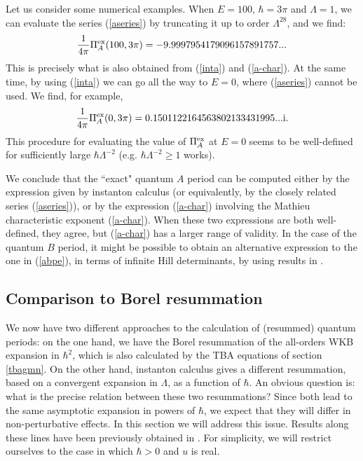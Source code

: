 \documentclass[a4paper,11pt]{article}
\theoremstyle{definition}
\newcommand{\ri}{{\rm i}}
\newcommand{\be}{\begin{equation}}
\newcommand{\ee}{\end{equation}}
\begin{document}
Let us consider some numerical examples. When $E=100$, $\hbar=3 \pi$ and $\Lambda=1$, we can evaluate the series (\ref{aseries}) by truncating it up to order $\Lambda^{28}$, and we find:
%
\be
{1\over 4 \pi } \Pi^{\rm ex}_A(100, 3 \pi)=-9.9997954179096157891757...
\ee
%
This is precisely what is also obtained from (\ref{inta}) and (\ref{a-char}). At the same time, by using (\ref{inta}) we can go all the way to $E=0$, where (\ref{aseries}) cannot be used. We find, for example, 
%
\be
 {1\over  4 \pi }\Pi^{\rm ex}_A(0, 3 \pi)=0.1501122164563802133431995... \ri. 
\ee
%
This procedure for evaluating the value of $\Pi^{\rm ex}_A$ at $E=0$ seems to be well-defined for sufficiently large $\hbar \Lambda^{-2}$ (e.g. $\hbar \Lambda^{-2} \ge 1$ works). 

We conclude that the ``exact" quantum $A$ period can be computed either
by the expression given by instanton calculus (or equivalently, by the
closely related series (\ref{aseries})), or by the expression
(\ref{a-char}) involving the Mathieu characteristic exponent
(\ref{a-char}). When these two expressions are both well-defined, they
agree, but (\ref{a-char}) has a larger range of validity. In the case
of the quantum $B$ period, it might be possible to obtain an alternative
expression to the one in (\ref{abpe}), in terms of infinite Hill
determinants, by using results in \cite{gutz1}.





\subsection{Comparison to Borel resummation}\label{bo}

We now have two different approaches to the calculation of (resummed)
quantum periods: on the one hand, we have the Borel resummation of the
all-orders WKB expansion in $\hbar^2$, which is also calculated by the
TBA equations of section \ref{tbagmn}. On the other hand, instanton
calculus gives a different resummation, based on a convergent
expansion in $\Lambda$, as a function of $\hbar$. An obvious question
is: what is the precise relation between these two resummations? Since
both lead to the same asymptotic expansion in powers of $\hbar$, we
expect that they will differ in non-perturbative effects. In this
section we will address this issue.  Results along these lines have
been previously obtained in \cite{kpt,ashok}. For simplicity, we will
restrict ourselves to the case in which $\hbar>0$ and $u$ is real.
\end{document}
